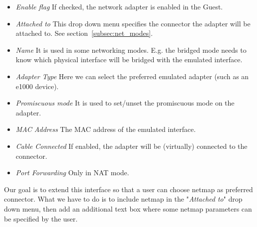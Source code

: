 \documentclass[a4paper, 12pt, titlepage]{report}
\begin{document}
\begin{itemize}
\item \textit{Enable flag} If checked, the network adapter is enabled in the Guest.
\item \textit{Attached to} This drop down menu specifies the connector the adapter will be attached to. See section~\ref{subsec:net_modes}.
\item \textit{Name} It is used in some networking modes. E.g. the bridged mode needs to know which physical interface will be bridged with the emulated interface.
\item \textit{Adapter Type} Here we can select the preferred emulated adapter (such as an e1000 device).
\item \textit{Promiscuous mode} It is used to set/unset the promiscuous mode on the adapter.
\item \textit{MAC Address} The MAC address of the emulated interface.
\item \textit{Cable Connected} If enabled, the adapter will be (virtually) connected to the connector.
\item \textit{Port Forwarding} Only in NAT mode.
\end{itemize}
Our goal is to extend this interface so that a user can choose netmap as preferred connector. What we have to do is to include netmap in the "\textit{Attached to}" drop down menu, then add an additional text box where some netmap parameters can be specified by the user.
\\
\end{document}
